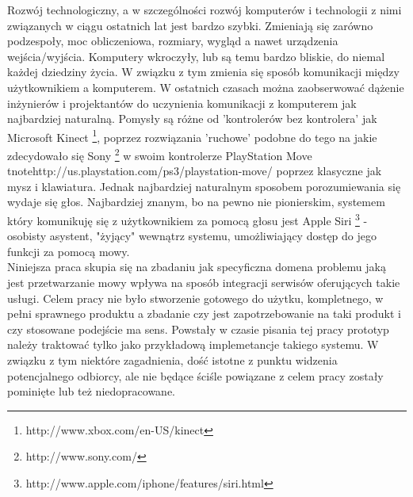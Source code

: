 

\begin{abstracts}        %

Rozwój technologiczny, a w szczególności rozwój komputerów i technologii z nimi związanych w ciągu ostatnich lat jest bardzo szybki. Zmieniają się zarówno podzespoły, moc obliczeniowa, rozmiary, wygląd a nawet urządzenia wejścia/wyjścia. Komputery wkroczyły, lub są temu bardzo bliskie, do niemal każdej dziedziny życia. W związku z tym zmienia się sposób komunikacji między użytkownikiem a komputerem. W ostatnich czasach można zaobserwować dążenie inżynierów i projektantów do uczynienia komunikacji z komputerem jak najbardziej naturalną. Pomysły są różne od 'kontrolerów bez kontrolera' jak Microsoft Kinect \footnote {http://www.xbox.com/en-US/kinect}, poprzez rozwiązania 'ruchowe' podobne do tego na jakie zdecydowało się Sony \footnote{http://www.sony.com/} w swoim kontrolerze PlayStation Move \foo
tnote{http://us.playstation.com/ps3/playstation-move/} poprzez klasyczne  jak mysz i klawiatura. Jednak najbardziej naturalnym sposobem porozumiewania się wydaje się głos. Najbardziej znanym, bo na pewno nie pionierskim, systemem który komunikuję się z użytkownikiem za pomocą głosu jest Apple Siri \footnote{http://www.apple.com/iphone/features/siri.html} - osobisty asystent, "żyjący" wewnątrz systemu, umożliwiający dostęp do jego funkcji za pomocą mowy.\\
Niniejsza praca skupia się na zbadaniu jak specyficzna domena problemu jaką jest przetwarzanie mowy wpływa na sposób integracji serwisów oferujących takie usługi. Celem pracy nie było stworzenie gotowego do użytku, kompletnego, w pełni sprawnego produktu a zbadanie czy jest zapotrzebowanie na taki produkt i czy stosowane podejście ma sens. Powstały w czasie pisania tej pracy prototyp należy traktować tylko jako przykładową implemetancje takiego systemu. W związku z tym niektóre zagadnienia, dość istotne z punktu widzenia potencjalnego odbiorcy, ale nie będące ściśle powiązane z celem pracy zostały pominięte lub też niedopracowane. 
\end{abstracts}


